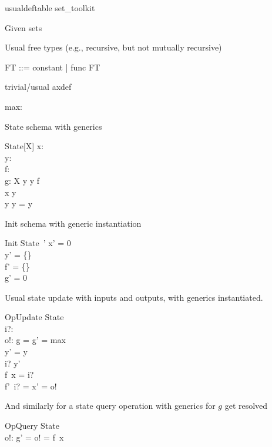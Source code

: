 \documentclass{article}
\begin{document}
\begin{zsection}
\SECTION usualdeftable \parents set\_toolkit
\end{zsection}

Given sets
\begin{zed}
   [G]
\end{zed}

Usual free types (e.g., recursive, but not mutually recursive)
\begin{zed}
   FT ::= constant | func \ldata \nat \cross FT \rdata
\end{zed}

trivial/usual axdef
\begin{axdef}
   max: \nat
\end{axdef}

State schema with generics
\begin{schema}{State}[X]
   x: \nat \\
   y: \power~\nat \\
   f: \nat \fun \nat \\
   g: X
\where
   y \cross y \subseteq f \\
   x \in y \\
   y \cap y = y
\end{schema}

Init schema with generic instantiation
\begin{schema}{Init}
   State~'
\where
   x' = 0 \\
   y' = \{\} \\
   f' = \{\} \\
   g' = 0
\end{schema}

Usual state update with inputs and outputs, with generics instantiated.
\begin{schema}{OpUpdate}
   \Delta State \\
   i?: \nat \\
   o!: \nat
\where
   g = g' = max \\ %
   y' = y \\
   i? \in y' \\
   f~x = i? \\
   f'~i? = x' = o!
\end{schema}

And similarly for a state query operation with generics for $g$ get resolved
\begin{schema}{OpQuery}
  \Xi State \\
  o!: \nat
\where
   g' = o! = f~x
\end{schema}
\end{document}
